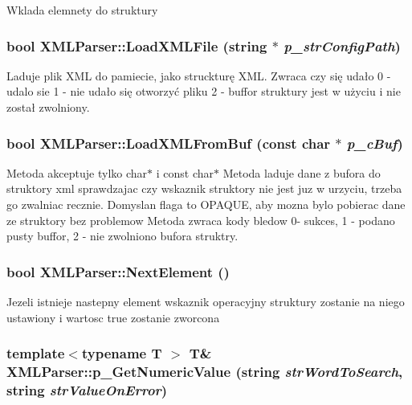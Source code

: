 Wklada elemnety do struktury

\hypertarget{classXMLParser_a995bf6dfb911fab6db31ffb0d7d12b96}{
\subsubsection[{LoadXMLFile}]{\setlength{\rightskip}{0pt plus 5cm}bool XMLParser::LoadXMLFile (string $\ast$ {\em p\_\-strConfigPath})}}
\label{classXMLParser_a995bf6dfb911fab6db31ffb0d7d12b96}


Laduje plik XML do pamiecie, jako struckturę XML. Zwraca czy się udało 0 -\/ udalo sie 1 -\/ nie udało się otworzyć pliku 2 -\/ buffor struktury jest w użyciu i nie został zwolniony.

\hypertarget{classXMLParser_a3d960023705bd1d8ef357bda9efdf73a}{
\subsubsection[{LoadXMLFromBuf}]{\setlength{\rightskip}{0pt plus 5cm}bool XMLParser::LoadXMLFromBuf (const char $\ast$ {\em p\_\-cBuf})}}
\label{classXMLParser_a3d960023705bd1d8ef357bda9efdf73a}


Metoda akceptuje tylko char$\ast$ i const char$\ast$ Metoda laduje dane z bufora do struktory xml sprawdzajac czy wskaznik struktory nie jest juz w urzyciu, trzeba go zwalniac recznie. Domyslan flaga to OPAQUE, aby mozna bylo pobierac dane ze struktory bez problemow Metoda zwraca kody bledow 0-\/ sukces, 1 -\/ podano pusty buffor, 2 -\/ nie zwolniono bufora struktry.

\hypertarget{classXMLParser_ab67f961bd0f1db53d7bd57f2ae18610d}{
\subsubsection[{NextElement}]{\setlength{\rightskip}{0pt plus 5cm}bool XMLParser::NextElement ()}}
\label{classXMLParser_ab67f961bd0f1db53d7bd57f2ae18610d}


Jezeli istnieje nastepny element wskaznik operacyjny struktury zostanie na niego ustawiony i wartosc true zostanie zworcona 

\hypertarget{classXMLParser_adb8af1fd3397c7e39e95a4e336afc445}{
\subsubsection[{p\_\-GetNumericValue}]{\setlength{\rightskip}{0pt plus 5cm}template$<$typename T $>$ T\& XMLParser::p\_\-GetNumericValue (string {\em strWordToSearch}, \/  string {\em strValueOnError})}}
\label{classXMLParser_adb8af1fd3397c7e39e95a4e336afc445}


